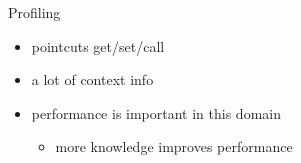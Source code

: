 \begin{frame}{Profiling}
  \begin{itemize}
\item pointcuts get/set/call %
\item a lot of context info  %
\item performance is important in this domain
\begin{itemize}
\item more knowledge improves performance 
\end{itemize}
\end{itemize}
\end{frame}
